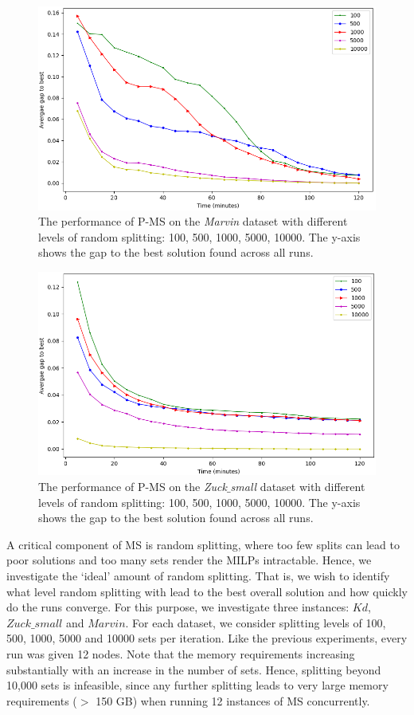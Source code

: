 \documentclass[authoryear,11pt,square,number,times,super,comma]{elsarticle}
\begin{document}
\begin{figure}[htbp]
  \includegraphics[width=14cm]{marvin_ransplit}
  \centering
  \caption{The performance of P-MS on the \emph{Marvin} dataset with different levels of random splitting: 100, 500, 1000, 5000, 10000. The y-axis shows the gap to the best solution found across all runs.}
  \label{fig:m_rs}
\end{figure}

\begin{figure}[htbp]
  \includegraphics[width=14cm]{zs_ransplit}
  \centering
  \caption{The performance of P-MS on the \emph{Zuck$\_$small} dataset with different levels of random splitting: 100, 500, 1000, 5000, 10000. The y-axis shows the gap to the best solution found across all runs.}
  \label{fig:zs_rs}
\end{figure}

A critical component of MS is random splitting, where too few splits can lead to poor solutions and too many sets render the MILPs intractable. Hence, we investigate the `ideal' amount of random splitting. That is, we wish to identify what level random splitting with lead to the best overall solution and how quickly do the runs converge. For this purpose, we investigate three instances: $Kd$, $Zuck\_small$ and $Marvin$. For each dataset, we consider splitting levels of 100, 500, 1000, 5000 and 10000 sets per iteration. Like the previous experiments, every run was given 12 nodes. Note that the memory requirements increasing substantially with an increase in the number of sets. Hence, splitting beyond 10,000 sets is infeasible, since any further splitting leads to very large memory requirements ($>$ 150 GB) when running 12 instances of MS concurrently.
\end{document}
